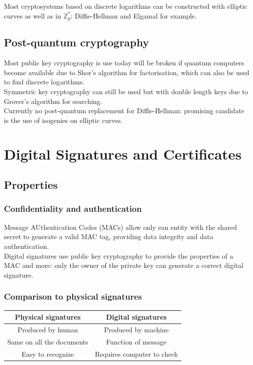 \documentclass{article}
\begin{document}
Most cryptosystems based on discrete logarithms can be constructed with elliptic curves as well as in $\mathbb{Z}_p^*$: Diffie-Hellman and Elgamal for example.

\subsection{Post-quantum cryptography}

Most public key cryptography is use today will be broken if quantum computers become available due to Shor’s algorithm for factorisation, which can also be used to find discrete logarithms.\\
Symmetric key cryptography can still be used but with double length keys due to Grover’s algorithm for searching.\\
Currently no post-quantum replacement for Diffie-Hellman: promising candidate is the use of isogenies on elliptic curves.

\newpage \section{Digital Signatures and Certificates}

\subsection{Properties}

\subsubsection{Confidentiality and authentication}

Message AUthentication Codes (MACs) allow only ean entity with the shared secret to generate a valid MAC tag, providing data integrity and data authentication.\\
Digital signatures use public key cryptography to provide the properties of a MAC and more: only the owner of the private key can generate a correct digital signature.\\

\subsubsection{Comparison to physical signatures}

\begin{center}
\begin{tabular}{ | c | c | }
\hline
Physical signatures & Digital signatures \\
\hline
Produced by human & Produced by machine \\
\hline
Same on all the documents & Function of message\\
\hline
Easy to recognize & Requires computer to check\\
\hline
\end{tabular}
\end{center}
\end{document}
